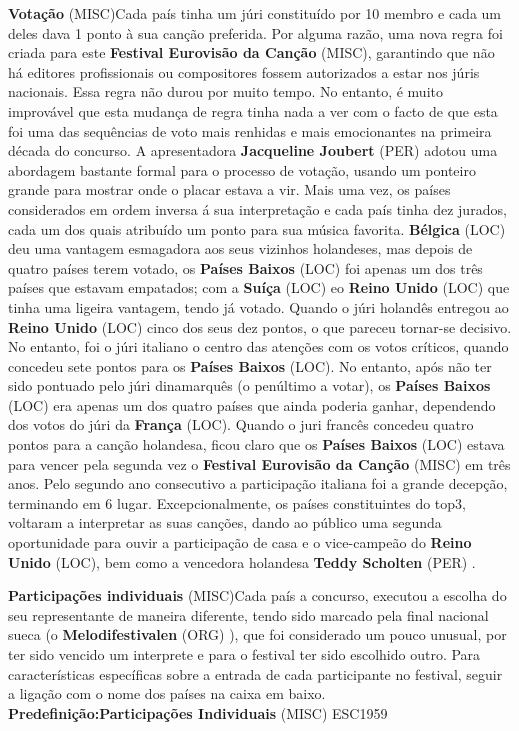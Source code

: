 \documentclass[12pt,a4paper]{article}
\begin{document}
\textbf{Votação} (MISC)Cada país tinha um júri constituído por 10 membro e cada um deles dava 1 ponto à sua canção preferida. Por alguma razão, uma nova regra foi criada para este \textbf{Festival Eurovisão da Canção} (MISC), garantindo que não há editores profissionais ou compositores fossem autorizados a estar nos júris nacionais. Essa regra não durou por muito tempo. No entanto, é muito improvável que esta mudança de regra tinha nada a ver com o facto de que esta foi uma das sequências de voto mais renhidas e mais emocionantes na primeira década do concurso. A apresentadora \textbf{Jacqueline Joubert} (PER) adotou uma abordagem bastante formal para o processo de votação, usando um ponteiro grande para mostrar onde o placar estava a vir. Mais uma vez, os países considerados em ordem inversa á sua interpretação e cada país tinha dez jurados, cada um dos quais atribuído um ponto para sua música favorita. \textbf{Bélgica} (LOC) deu uma vantagem esmagadora aos seus vizinhos holandeses, mas depois de quatro países terem votado, os \textbf{Países Baixos} (LOC) foi apenas um dos três países que estavam empatados; com a \textbf{Suíça} (LOC) eo \textbf{Reino Unido} (LOC) que tinha uma ligeira vantagem, tendo já votado. Quando o júri holandês entregou ao \textbf{Reino Unido} (LOC) cinco dos seus dez pontos, o que pareceu tornar-se decisivo. No entanto, foi o júri italiano o centro das atenções com os votos críticos, quando concedeu sete pontos para os \textbf{Países Baixos} (LOC). No entanto, após não ter sido pontuado pelo júri dinamarquês (o penúltimo a votar), os \textbf{Países Baixos} (LOC) era apenas um dos quatro países que ainda poderia ganhar, dependendo dos votos do júri da \textbf{França} (LOC). Quando o juri francês concedeu quatro pontos para a canção holandesa, ficou claro que os \textbf{Países Baixos} (LOC) estava para vencer pela segunda vez o \textbf{Festival Eurovisão da Canção} (MISC) em três anos. Pelo segundo ano consecutivo a participação italiana foi a grande decepção, terminando em 6 lugar. Excepcionalmente, os países constituintes do top3, voltaram a interpretar as suas canções, dando ao público uma segunda oportunidade para ouvir a participação de casa e o vice-campeão do \textbf{Reino Unido} (LOC), bem como a vencedora holandesa \textbf{Teddy Scholten} (PER) .



\textbf{Participações individuais} (MISC)Cada país a concurso, executou a escolha do seu representante de maneira diferente, tendo sido marcado pela final nacional sueca (o \textbf{Melodifestivalen} (ORG) ), que foi considerado um pouco unusual, por ter sido vencido um interprete e para o festival ter sido escolhido outro. Para características específicas sobre a entrada de cada participante no festival, seguir a ligação com o nome dos países na caixa em baixo. \textbf{Predefinição:Participações Individuais} (MISC) ESC1959
\end{document}
